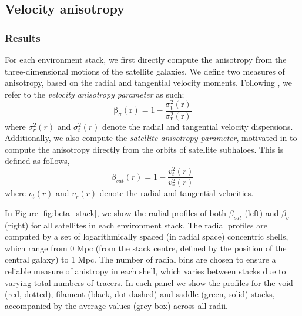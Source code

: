 \subsection{Velocity anisotropy} \label{sec:velocity_anisotropy}
\subsubsection{Results}
For each environment stack, we first directly compute the anisotropy from the three-dimensional motions of the satellite galaxies. We define two measures of anisotropy, based on the radial and tangential velocity moments. Following \citet{faltenbacher2010}, we refer to the \textit{velocity anisotropy parameter} as such;
\begin{equation} \label{eq:vel_ani_sigma}
\mathrm{\beta_{\sigma}(r) = 1 - \frac{\sigma_t^2(r)}{\sigma_r^2(r)} }
\end{equation}
where $\sigma_r^2(r)$ and $\sigma_t^2(r)$ denote the radial and tangential velocity dispersions. Additionally, we also compute the \textit{satellite anisotropy parameter}, motivated in \citet{ZOMGiii} to compute the anisotropy directly from the orbits of satellite subhaloes. This is defined as follows,
\begin{equation}
\beta_{sat}(r) = 1 - \frac{v_{t}^2(r)}{v_{r}^{2}(r)} 
\end{equation}
where $v_{t}(r)$ and $v_{r}(r)$ denote the radial and tangential velocities.

In Figure \ref{fig:beta_stack}, we show the radial profiles of both $\beta_{sat}$ (left) and $\beta_{\sigma}$ (right) for all satellites in each environment stack. The radial profiles are computed by a set of logarithmically spaced (in radial space) concentric shells, which range from 0 Mpc (from the stack centre, defined by the position of the central galaxy) to 1 Mpc. The number of radial bins are chosen to ensure a reliable measure of anistropy in each shell, which varies between stacks due to varying total numbers of tracers. In each panel we show the profiles for the void (red, dotted), filament (black, dot-dashed) and saddle (green, solid) stacks, accompanied by the average values (grey box) across all radii. 

